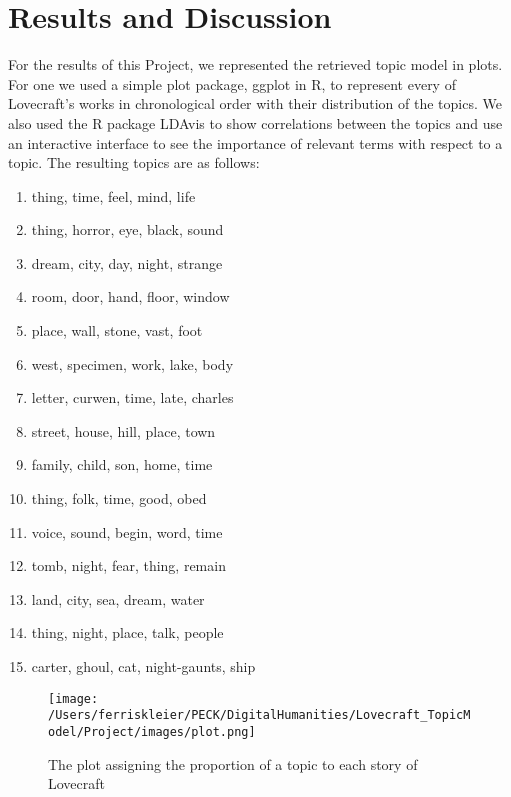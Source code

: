 \section{Results and Discussion}

For the results of this Project, we represented the retrieved topic model in plots. For one we 
used a simple plot package, ggplot in R, to represent every of Lovecraft’s works in chronological 
order with their distribution of the topics. We also used the R package LDAvis to show correlations 
between the topics and use an interactive interface to see the importance of relevant terms with 
respect to a topic. The resulting topics are as follows:

\begin{enumerate}
    \itemsep0em
    \item thing, time, feel, mind, life
    \item thing, horror, eye, black, sound
    \item dream, city, day, night, strange
    \item room, door, hand, floor, window
    \item place, wall, stone, vast, foot
    \item west, specimen, work, lake, body
    \item letter, curwen, time, late, charles
    \item street, house, hill, place, town
    \item family, child, son, home, time
    \item thing, folk, time, good, obed
    \item voice, sound, begin, word, time
    \item tomb, night, fear, thing, remain
    \item land, city, sea, dream, water
    \item thing, night, place, talk, people
    \item carter, ghoul, cat, night-gaunts, ship
\end{enumerate}

\begin{figure}[h]
    \centering
    \texttt{[image: /Users/ferriskleier/PECK/DigitalHumanities/Lovecraft\_TopicModel/Project/images/plot.png]}
    \caption{The plot assigning the proportion of a topic to each story of Lovecraft}
    \label{fig:mesh1}
\end{figure}

